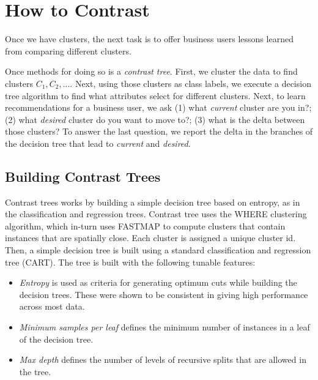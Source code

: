 \documentclass[conference]{IEEEtran}
\begin{document}
	\section{How to Contrast}
	Once we have  clusters, the next task is to offer business users lessons learned from comparing different clusters.
	
	Once methods for doing so is a {\em contrast tree}.
	First, we cluster the data to find clusters $C_1,C_2,...$.
	Next, using those clusters as class labels, we execute a decision tree algorithm to find what attributes select for different clusters. Next, to learn recommendations for a business user, we ask (1) what {\em current} cluster are you in?; (2) what {\em desired} cluster do you want to move to?; (3) what is the delta between those clusters? To answer the last question, we report the delta in the branches of the decision tree that lead to {\em current} and {\em desired}. 
	
	\subsection{Building Contrast Trees}
	Contrast trees works by building a simple decision tree based on entropy, as in the classification and regression trees. Contrast tree uses the WHERE clustering algorithm, which in-turn uses FASTMAP \cite{fastmap} to compute clusters 
	that contain instances that are spatially close. Each cluster is assigned a unique cluster id. Then, a simple decision tree is built using a standard classification and regression tree (CART). The tree is built with the following tunable features:
	\begin{itemize}
		\item \textit{Entropy} is used as criteria for generating optimum cuts while building the decision trees. These were shown to be consistent in giving high performance across most data.
		\item \textit{Minimum samples per leaf} defines the minimum number of instances in a leaf of the decision tree.
		\item \textit{Max depth} defines the number of levels of recursive splits that are allowed in the tree.
	\end{itemize}
	
\end{document}
